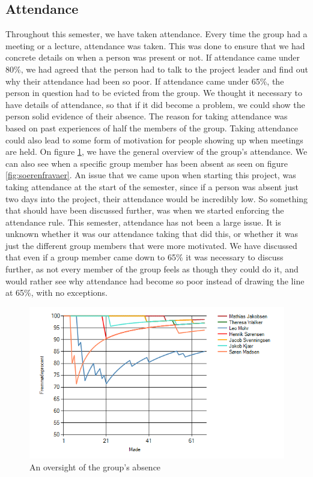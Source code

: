 \documentclass{article}
\begin{document}
\subsection{Attendance}
Throughout this semester, we have taken attendance. 
Every time the group had a meeting or a lecture, attendance was taken. 
This was done to ensure that we had concrete details on when a person was present or not. 
If attendance came under 80\%, we had agreed that the person had to talk to the project leader and find out why their attendance had been so poor. 
If attendance came under 65\%, the person in question had to be evicted from the group. 
We thought it necessary to have details of attendance, so that if it did become a problem, we could show the person solid evidence of their absence. 
The reason for taking attendance was based on past experiences of half the members of the group. 
Taking attendance could also lead to some form of motivation for people showing up when meetings are held.
On figure \ref{fig:GraphImage}, we have the general overview of the group's attendance. We can also see when a specific group member has been absent as seen on figure \ref{fig:soerenfravaer}.
An issue that we came upon when starting this project, was taking attendance at the start of the semester, since if a person was absent just two days into the project, their attendance would be incredibly low. 
So something that should have been discussed further, was when we started enforcing the attendance rule. 
This semester, attendance has not been a large issue. 
It is unknown whether it was our attendance taking that did this, or whether it was just the different group members that were more motivated.
We have discussed that even if a group member came down to 65\% it was necessary to discuss further, as not every member of the group feels as though they could do it, and would rather see why attendance had become so poor instead of drawing the line at 65\%, with no exceptions.

\begin{figure}
	\centering
	\includegraphics[width=1\textwidth]{figures/GraphImage.png}
	\caption{An oversight of the group's absence}
	\label{fig:GraphImage}
\end{figure}
\end{document}
